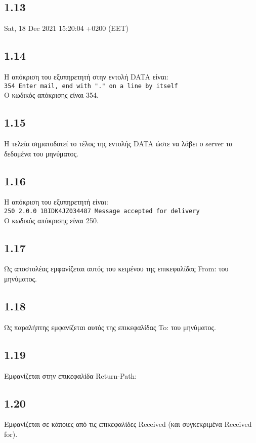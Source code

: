 		\subsection*{1.13} 
			Sat, 18 Dec 2021 15:20:04 +0200 (EET)

		\subsection*{1.14} 
			Η απόκριση του εξυπηρετητή στην εντολή DATA είναι: \\
			
			\verb|354 Enter mail, end with "." on a line by itself| \\
			
			Ο κωδικός απόκρισης είναι 354.

		\subsection*{1.15} 
			Η τελεία σηματοδοτεί το τέλος της εντολής DATA ώστε να λάβει ο server τα δεδομένα του μηνύματος.

		\subsection*{1.16} 
			Η απόκριση του εξυπηρετητή είναι: \\
			
			\verb|250 2.0.0 1BIDK4JZ034487 Message accepted for delivery| \\
			
			Ο κωδικός απόκρισης είναι 250.

		\subsection*{1.17} 
			Ως αποστολέας εμφανίζεται αυτός του κειμένου της επικεφαλίδας From: του μηνύματος.

		\subsection*{1.18} 
			Ως παραλήπτης εμφανίζεται αυτός της επικεφαλίδας To: του μηνύματος.

		\subsection*{1.19} 
			Εμφανίζεται στην επικεφαλίδα Return-Path:

		\subsection*{1.20} 
			Εμφανίζεται σε κάποιες από τις επικεφαλίδες Received (και συγκεκριμένα Received for).


